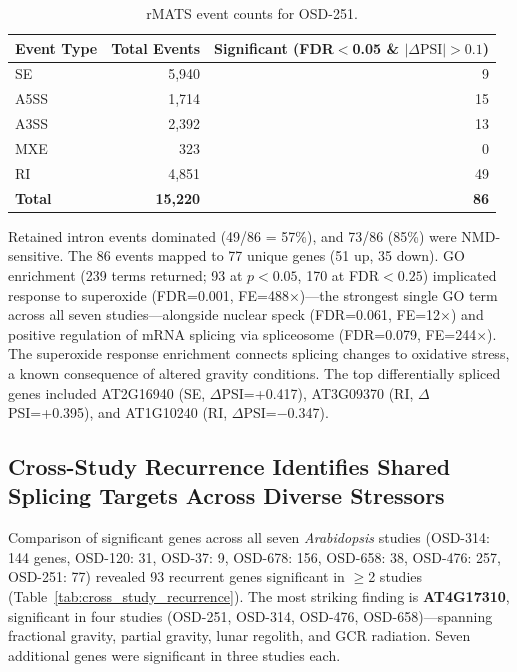 \documentclass[12pt,a4paper]{article}
\begin{document}
\begin{table}[h]
\centering
\caption{rMATS event counts for OSD-251.}
\label{tab:osd251_events}
\begin{tabular}{lrr}
\toprule
\textbf{Event Type} & \textbf{Total Events} & \textbf{Significant (FDR$<$0.05 \& $|\Delta\text{PSI}|>0.1$)} \\
\midrule
SE & 5,940 & 9 \\
A5SS & 1,714 & 15 \\
A3SS & 2,392 & 13 \\
MXE & 323 & 0 \\
RI & 4,851 & 49 \\
\textbf{Total} & \textbf{15,220} & \textbf{86} \\
\bottomrule
\end{tabular}
\end{table}

Retained intron events dominated (49/86 = 57\%), and 73/86 (85\%) were NMD-sensitive. The 86 events mapped to 77 unique genes (51 up, 35 down). GO enrichment (239 terms returned; 93 at $p<0.05$, 170 at FDR$<0.25$) implicated response to superoxide (FDR=0.001, FE=488$\times$)---the strongest single GO term across all seven studies---alongside nuclear speck (FDR=0.061, FE=12$\times$) and positive regulation of mRNA splicing via spliceosome (FDR=0.079, FE=244$\times$). The superoxide response enrichment connects splicing changes to oxidative stress, a known consequence of altered gravity conditions. The top differentially spliced genes included AT2G16940 (SE, $\Delta$PSI=+0.417), AT3G09370 (RI, $\Delta$PSI=+0.395), and AT1G10240 (RI, $\Delta$PSI=$-$0.347).

\subsection{Cross-Study Recurrence Identifies Shared Splicing Targets Across Diverse Stressors}

Comparison of significant genes across all seven \textit{Arabidopsis} studies (OSD-314: 144 genes, OSD-120: 31, OSD-37: 9, OSD-678: 156, OSD-658: 38, OSD-476: 257, OSD-251: 77) revealed 93 recurrent genes significant in $\geq$2 studies (Table~\ref{tab:cross_study_recurrence}). The most striking finding is \textbf{AT4G17310}, significant in four studies (OSD-251, OSD-314, OSD-476, OSD-658)---spanning fractional gravity, partial gravity, lunar regolith, and GCR radiation. Seven additional genes were significant in three studies each.
\end{document}
